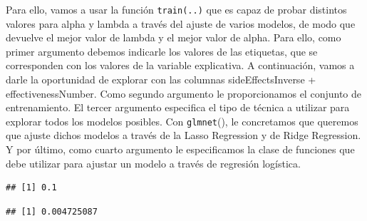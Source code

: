 \documentclass[spanish,]{article}
\newenvironment{Shaded}{\begin{snugshade}}{\end{snugshade}}
\newcommand{\KeywordTok}[1]{\textcolor[rgb]{0.13,0.29,0.53}{\textbf{#1}}}
\newcommand{\DataTypeTok}[1]{\textcolor[rgb]{0.13,0.29,0.53}{#1}}
\newcommand{\StringTok}[1]{\textcolor[rgb]{0.31,0.60,0.02}{#1}}
\newcommand{\CommentTok}[1]{\textcolor[rgb]{0.56,0.35,0.01}{\textit{#1}}}
\newcommand{\OperatorTok}[1]{\textcolor[rgb]{0.81,0.36,0.00}{\textbf{#1}}}
\newcommand{\NormalTok}[1]{#1}
\begin{document}
Para ello, vamos a usar la función \texttt{train(..)} que es capaz de
probar distintos valores para alpha y lambda a través del ajuste de
varios modelos, de modo que devuelve el mejor valor de lambda y el mejor
valor de alpha. Para ello, como primer argumento debemos indicarle los
valores de las etiquetas, que se corresponden con los valores de la
variable explicativa. A continuación, vamos a darle la oportunidad de
explorar con las columnas sideEffectsInverse + effectivenessNumber. Como
segundo argumento le proporcionamos el conjunto de entrenamiento. El
tercer argumento especifica el tipo de técnica a utilizar para explorar
todos los modelos posibles. Con \texttt{glmnet}(), le concretamos que
queremos que ajuste dichos modelos a través de la Lasso Regression y de
Ridge Regression. Y por último, como cuarto argumento le especificamos
la clase de funciones que debe utilizar para ajustar un modelo a través
de regresión logística.

\begin{Shaded}
\end{Shaded}

\begin{verbatim}
## [1] 0.1
\end{verbatim}

\begin{Shaded}
\end{Shaded}

\begin{verbatim}
## [1] 0.004725087
\end{verbatim}
\end{document}
